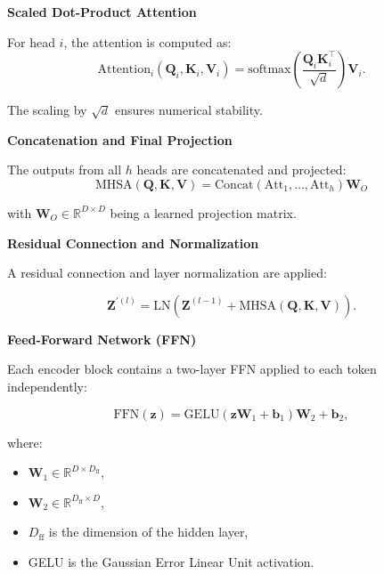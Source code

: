 \textbf{Scaled Dot-Product Attention}

For head \(i\), the attention is computed as:
\begin{equation}
  \text{Attention}_i(\mathbf{Q}_i, \mathbf{K}_i, \mathbf{V}_i) = \text{softmax}\left(\frac{\mathbf{Q}_i \mathbf{K}_i^\top}{\sqrt{d}}\right) \mathbf{V}_i.
\end{equation}

The scaling by \(\sqrt{d}\) ensures numerical stability.

\textbf{Concatenation and Final Projection}

The outputs from all \(h\) heads are concatenated and projected:
\begin{equation}
    \text{MHSA}(\mathbf{Q}, \mathbf{K}, \mathbf{V}) = \text{Concat}\left(\text{Att}_1, \dots, \text{Att}_h\right) \mathbf{W}_O
    \label{eq:mhsa}
\end{equation}

with \(\mathbf{W}_O \in \mathbb{R}^{D \times D}\) being a learned projection matrix.

\textbf{Residual Connection and Normalization}

A residual connection and layer normalization are applied:

\begin{equation}
\mathbf{Z}^{\prime(l)} = \text{LN}\left(\mathbf{Z}^{(l-1)} + \text{MHSA}(\mathbf{Q}, \mathbf{K}, \mathbf{V})\right).
\label{eq:residual}
\end{equation}

\textbf{Feed-Forward Network (FFN)}

Each encoder block contains a two-layer FFN applied to each token independently:

\begin{equation}
  \text{FFN}(\mathbf{z}) = \text{GELU}\left(\mathbf{z} \mathbf{W}_1 + \mathbf{b}_1\right) \mathbf{W}_2 + \mathbf{b}_2,
\end{equation}

where:
\begin{itemize}
  \item \(\mathbf{W}_1 \in \mathbb{R}^{D \times D_{\text{ff}}}\),
  \item \(\mathbf{W}_2 \in \mathbb{R}^{D_{\text{ff}} \times D}\),
  \item \(D_{\text{ff}}\) is the dimension of the hidden layer,
  \item GELU is the Gaussian Error Linear Unit activation.
\end{itemize}

